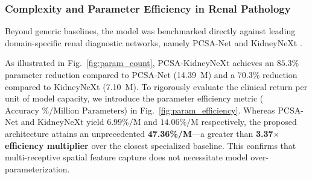 \documentclass[]{elsarticle}
\begin{document}
\begin{table}[H]
\centering
\caption{Quantitative comparison of model complexity, storage size, FLOPs, CPU inference latency, and diagnostic throughput across standard vision baselines and the proposed PCSA-KidneyNeXt.}
\label{tab:benchmark_comparison}
\vspace{0.2cm}
\end{table}

\subsubsection{Complexity and Parameter Efficiency in Renal Pathology}
Beyond generic baselines, the model was benchmarked directly against leading domain-specific renal diagnostic networks, namely PCSA-Net \citep{tawfik2026pcsa} and KidneyNeXt \citep{macin2025kidneynext}. 

As illustrated in Fig.~\ref{fig:param_count}, PCSA-KidneyNeXt achieves an $85.3\%$ parameter reduction compared to PCSA-Net (14.39~M) and a $70.3\%$ reduction compared to KidneyNeXt (7.10~M). To rigorously evaluate the clinical return per unit of model capacity, we introduce the parameter efficiency metric ($\text{Accuracy \%} / \text{Million Parameters}$) in Fig.~\ref{fig:param_efficiency}. Whereas PCSA-Net and KidneyNeXt yield $6.99\%/\text{M}$ and $14.06\%/\text{M}$ respectively, the proposed architecture attains an unprecedented \textbf{47.36\%/M}—a greater than \textbf{3.37$\times$ efficiency multiplier} over the closest specialized baseline. This confirms that multi-receptive spatial feature capture does not necessitate model over-parameterization.
\end{document}
